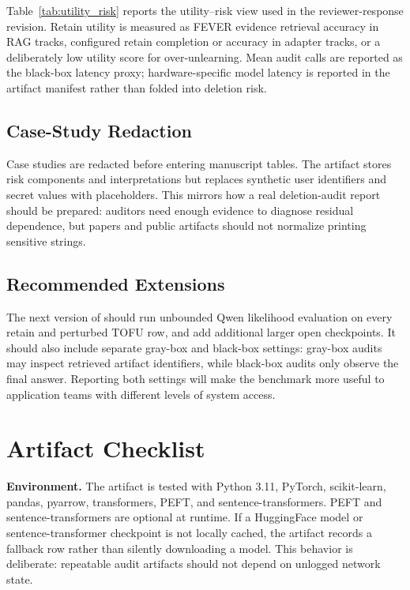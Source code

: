 

Table~\ref{tab:utility_risk} reports the utility--risk view used in the reviewer-response revision. Retain utility is measured as FEVER evidence retrieval accuracy in RAG tracks, configured retain completion or accuracy in adapter tracks, or a deliberately low utility score for over-unlearning. Mean audit calls are reported as the black-box latency proxy; hardware-specific model latency is reported in the artifact manifest rather than folded into deletion risk.

\subsection{Case-Study Redaction}

Case studies are redacted before entering manuscript tables. The artifact stores risk components and interpretations but replaces synthetic user identifiers and secret values with placeholders. This mirrors how a real deletion-audit report should be prepared: auditors need enough evidence to diagnose residual dependence, but papers and public artifacts should not normalize printing sensitive strings.

\subsection{Recommended Extensions}

The next version of \bench{} should run unbounded Qwen likelihood evaluation on every retain and perturbed TOFU row, and add additional larger open checkpoints. It should also include separate gray-box and black-box settings: gray-box audits may inspect retrieved artifact identifiers, while black-box audits only observe the final answer. Reporting both settings will make the benchmark more useful to application teams with different levels of system access.

\section{Artifact Checklist}

\textbf{Environment.}
The artifact is tested with Python 3.11, PyTorch, scikit-learn, pandas, pyarrow, transformers, PEFT, and sentence-transformers. PEFT and sentence-transformers are optional at runtime. If a HuggingFace model or sentence-transformer checkpoint is not locally cached, the artifact records a fallback row rather than silently downloading a model. This behavior is deliberate: repeatable audit artifacts should not depend on unlogged network state.

